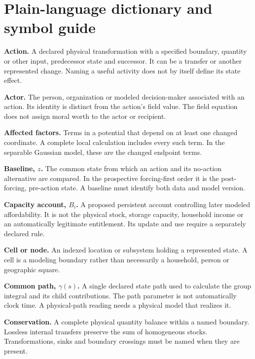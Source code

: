\chapter*{Plain-language dictionary and symbol guide}

\textbf{Action.} A declared physical transformation with a specified boundary, quantity or other input, predecessor state and successor. It can be a transfer or another represented change. Naming a useful activity does not by itself define its state effect.

\textbf{Actor.} The person, organization or modeled decision-maker associated with an action. Its identity is distinct from the action's field value. The field equation does not assign moral worth to the actor or recipient.

\textbf{Affected factors.} Terms in a potential that depend on at least one changed coordinate. A complete local calculation includes every such term. In the separable Gaussian model, these are the changed endpoint terms.

\textbf{Baseline, $z$.} The common state from which an action and its no-action alternative are compared. In the prospective forcing-first order it is the post-forcing, pre-action state. A baseline must identify both data and model version.

\textbf{Capacity account, $B_i$.} A proposed persistent account controlling later modeled affordability. It is not the physical stock, storage capacity, household income or an automatically legitimate entitlement. Its update and use require a separately declared rule.

\textbf{Cell or node.} An indexed location or subsystem holding a represented state. A cell is a modeling boundary rather than necessarily a household, person or geographic square.

\textbf{Common path, $\gamma(s)$.} A single declared state path used to calculate the group integral and its child contributions. The path parameter is not automatically clock time. A physical-path reading needs a physical model that realizes it.

\textbf{Conservation.} A complete physical quantity balance within a named boundary. Lossless internal transfers preserve the sum of homogeneous stocks. Transformations, sinks and boundary crossings must be named when they are present.

